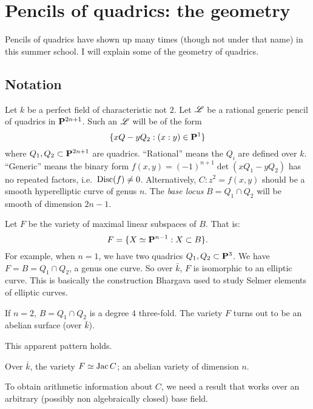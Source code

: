 
\section{Pencils of quadrics: the geometry}\label{sec:wang-i}





Pencils of quadrics have shown up many times (though not under that name) in 
this summer school. I will explain some of the geometry of quadrics. 





\subsection{Notation}

Let $k$ be a perfect field of characteristic not $2$. Let $\mathscr{L}$ be a 
rational generic pencil of quadrics in $\mathbf{P}^{2n+1}$. Such an $\mathscr{L}$ will be 
of the form 
\[
  \{x Q-y Q_2:(x:y)\in \mathbf{P}^1\}
\]
where $Q_1,Q_2\subset \mathbf{P}^{2n+1}$ are quadrics. ``Rational'' means the $Q_i$ 
are defined over $k$. ``Generic'' means the binary form 
$f(x,y) = (-1)^{n+1}\det(x Q_1-y Q_2)$ has no repeated factors, 
i.e.~$\operatorname{Disc}(f)\ne 0$. Alternatively, $C:z^2=f(x,y)$ should be a smooth 
hyperelliptic curve of genus $n$. The \emph{base locus} $B=Q_1\cap Q_2$ will 
be smooth of dimension $2 n-1$. 

Let $F$ be the variety of maximal linear subspaces of $B$. That is: 
\[
  F=\{X\simeq \mathbf{P}^{n-1}:X\subset B\} .
\]
For example, when $n=1$, we have two quadrics $Q_1,Q_2\subset \mathbf{P}^3$. We have 
$F=B=Q_1\cap Q_2$, a genus one curve. So over $\bar k$, $F$ is isomorphic to an 
elliptic curve. This is basically the construction Bhargava used to study 
Selmer elements of elliptic curves. 

If $n=2$, $B=Q_1\cap Q_2$ is a degree $4$ three-fold. The variety $F$ turns 
out to be an abelian surface (over $\bar k$). 

This apparent pattern holds. 

\begin{theo}
Over $\bar k$, the variety $F\simeq \operatorname{Jac} C$; an abelian variety of 
dimension $n$. 
\end{theo}

To obtain arithmetic information about $C$, we need a result that works over 
an arbitrary (possibly non algebraically closed) base field. 

